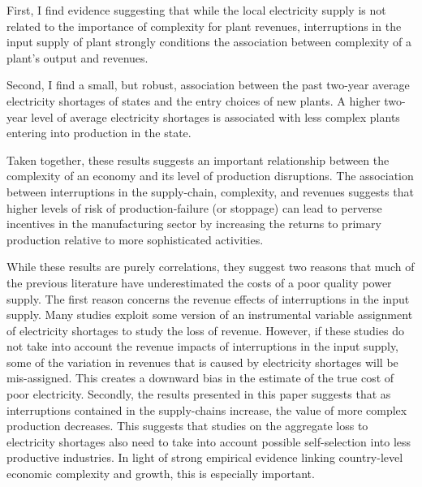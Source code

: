 \documentclass[11pt]{article}
\begin{document}
First, I find evidence suggesting that while the local electricity supply is not related to the importance of complexity for plant revenues, interruptions in the input supply of plant strongly conditions the association between complexity of a plant's output and revenues.

Second, I find a small, but robust, association between the past two-year average electricity shortages of states and the entry choices of new plants. A higher two-year level of average electricity shortages is associated with less complex plants entering into production in the state. 

Taken together, these results suggests an important relationship between the complexity of an economy and its level of production disruptions. The association between interruptions in the supply-chain, complexity, and revenues suggests that higher levels of risk of production-failure (or stoppage) can lead to perverse incentives in the manufacturing sector by increasing the returns to primary production relative to more sophisticated activities. 

While these results are purely correlations, they suggest two reasons that much of the previous literature have underestimated the costs of a poor quality power supply. The first reason concerns the revenue effects of interruptions in the input supply. Many studies exploit some version of an instrumental variable assignment of electricity shortages to study the loss of revenue. However, if these studies do not take into account the revenue impacts of interruptions in the input supply, some of the variation in revenues that is caused by electricity shortages will be mis-assigned. This creates a downward bias in the estimate of the true cost of poor electricity. Secondly, the results presented in this paper suggests that as interruptions contained in the supply-chains increase, the value of more complex production decreases. This suggests that studies on the aggregate loss to electricity shortages also need to take into account possible self-selection into less productive industries. In light of strong empirical evidence linking country-level economic complexity and growth, this is especially important.






\newpage
\end{document}
